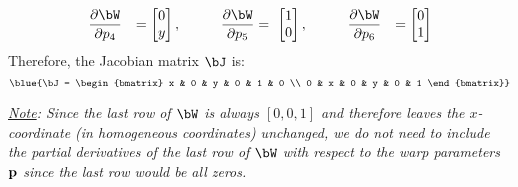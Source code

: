 \begin{problem}
\begin{answer}
\begin{alignat*}{5}
      &\frac{\partial \bW}{\partial p_4} &= \begin{bmatrix}
        0 \\ y
      \end{bmatrix}, \qquad
      &&\frac{\partial \bW}{\partial p_5} &= \
      \begin{bmatrix}
        1 \\ 0
      \end{bmatrix}, \qquad
      &&\frac{\partial \bW}{\partial p_6} &= \begin{bmatrix}
        0 \\ 1
      \end{bmatrix}
    \end{alignat*}
    Therefore, the Jacobian matrix $\bJ$ is:
    \[
      \blue{\bJ = \begin{bmatrix}
        x & 0 & y & 0 & 1 & 0 \\ 0 & x & 0 & y & 0 & 1
      \end{bmatrix}}
    \]
    
    \emph{
      \underline{Note}: Since the last row of $\bW$ is always $[0, 0, 1]$
      and therefore leaves the $x$-coordinate (in homogeneous coordinates)
      unchanged, we do not need to include the partial derivatives of the
      last row of $\bW$ with respect to the warp parameters $\mathbf{p}$
      since the last row would be all zeros.
    }
  \end{answer}
\end{problem}

